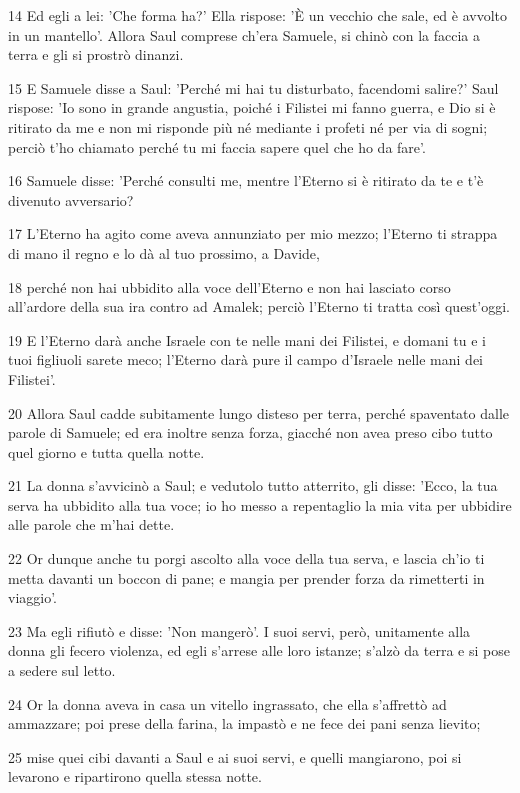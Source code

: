 \par 14 Ed egli a lei: 'Che forma ha?' Ella rispose: 'È un vecchio che sale, ed è avvolto in un mantello'. Allora Saul comprese ch'era Samuele, si chinò con la faccia a terra e gli si prostrò dinanzi.
\par 15 E Samuele disse a Saul: 'Perché mi hai tu disturbato, facendomi salire?' Saul rispose: 'Io sono in grande angustia, poiché i Filistei mi fanno guerra, e Dio si è ritirato da me e non mi risponde più né mediante i profeti né per via di sogni; perciò t'ho chiamato perché tu mi faccia sapere quel che ho da fare'.
\par 16 Samuele disse: 'Perché consulti me, mentre l'Eterno si è ritirato da te e t'è divenuto avversario?
\par 17 L'Eterno ha agito come aveva annunziato per mio mezzo; l'Eterno ti strappa di mano il regno e lo dà al tuo prossimo, a Davide,
\par 18 perché non hai ubbidito alla voce dell'Eterno e non hai lasciato corso all'ardore della sua ira contro ad Amalek; perciò l'Eterno ti tratta così quest'oggi.
\par 19 E l'Eterno darà anche Israele con te nelle mani dei Filistei, e domani tu e i tuoi figliuoli sarete meco; l'Eterno darà pure il campo d'Israele nelle mani dei Filistei'.
\par 20 Allora Saul cadde subitamente lungo disteso per terra, perché spaventato dalle parole di Samuele; ed era inoltre senza forza, giacché non avea preso cibo tutto quel giorno e tutta quella notte.
\par 21 La donna s'avvicinò a Saul; e vedutolo tutto atterrito, gli disse: 'Ecco, la tua serva ha ubbidito alla tua voce; io ho messo a repentaglio la mia vita per ubbidire alle parole che m'hai dette.
\par 22 Or dunque anche tu porgi ascolto alla voce della tua serva, e lascia ch'io ti metta davanti un boccon di pane; e mangia per prender forza da rimetterti in viaggio'.
\par 23 Ma egli rifiutò e disse: 'Non mangerò'. I suoi servi, però, unitamente alla donna gli fecero violenza, ed egli s'arrese alle loro istanze; s'alzò da terra e si pose a sedere sul letto.
\par 24 Or la donna aveva in casa un vitello ingrassato, che ella s'affrettò ad ammazzare; poi prese della farina, la impastò e ne fece dei pani senza lievito;
\par 25 mise quei cibi davanti a Saul e ai suoi servi, e quelli mangiarono, poi si levarono e ripartirono quella stessa notte.

